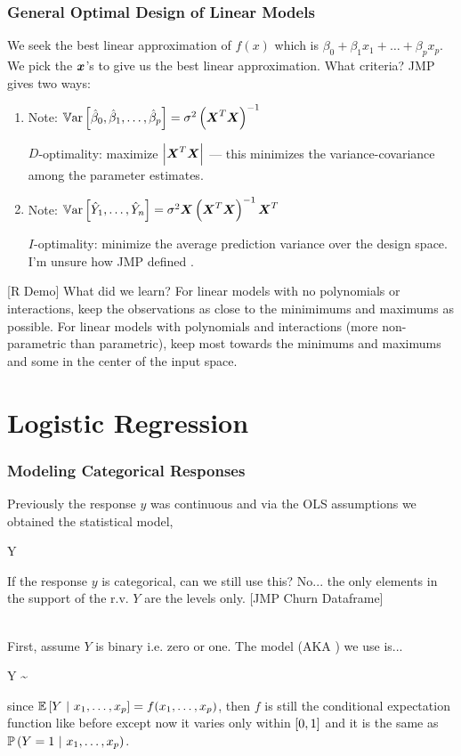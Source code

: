 \documentclass[slides]{beamer} %
\begin{document}
\begin{frame}\frametitle{General Optimal Design of Linear Models}
\small

We seek the best linear approximation of $f(x)$ which is $\beta_0 + \beta_1 x _1+ \ldots + \beta_p x_p$. We pick the $\boldsymbol{x}$'s to give us the best linear approximation. What criteria? JMP gives two ways:

\begin{enumerate}
\item Note: $\mathbb{V}\text{ar}\left[\hat{\beta}_0, \hat{\beta}_1, \ldots, \hat{\beta}_p\right] = \sigma^2 \left(\boldsymbol{X}^T\boldsymbol{X}\right)^{-1}$ \pause

$D$-optimality: maximize $\left|\boldsymbol{X}^T\boldsymbol{X}\right|$ --- this minimizes the variance-covariance among the parameter estimates. \pause

\item Note: $\mathbb{V}\text{ar}\left[\hat{Y}_1, \ldots, \hat{Y}_n\right] = \sigma^2 \boldsymbol{X}\left(\boldsymbol{X}^T\boldsymbol{X}\right)^{-1}\boldsymbol{X}^T$ \pause 

$I$-optimality: minimize the average prediction variance over the design space. I'm unsure how JMP defined .
\end{enumerate}

[R Demo] \pause What did we learn? \pause For linear models with no polynomials or interactions, keep the observations as close to the minimimums and maximums as possible. For linear models with polynomials and interactions (more non-parametric than parametric), \pause keep most towards the minimums and maximums and some in the center of the input space.

\end{frame}



\section{Logistic Regression}


\begin{frame}\frametitle{Modeling Categorical Responses}

Previously the response $y$ was continuous and via the OLS assumptions we obtained the statistical model,

\beqn
Y \inddist {}
\eeqn

If the response $y$ is categorical, can we still use this? \pause No... the only elements in the support of the r.v. $Y$ are the levels only. [JMP Churn Dataframe] \\~\\ \pause 

First, assume $Y$ is binary i.e. zero or one. The model (AKA ) we use is...\pause  

\beqn
Y \sim {}
\eeqn

since $\mathbb{E}\left[Y~|~x_1, \ldots, x_p\right] = f(x_1, \ldots, x_p)$, then $f$ is still the conditional expectation function like before except now it varies only within \pause $\left[0,1\right]$ and it is the same as \pause   $\mathbb{P}\left(Y = 1~|~x_1, \ldots, x_p\right)$.

\end{frame}
\end{document}
